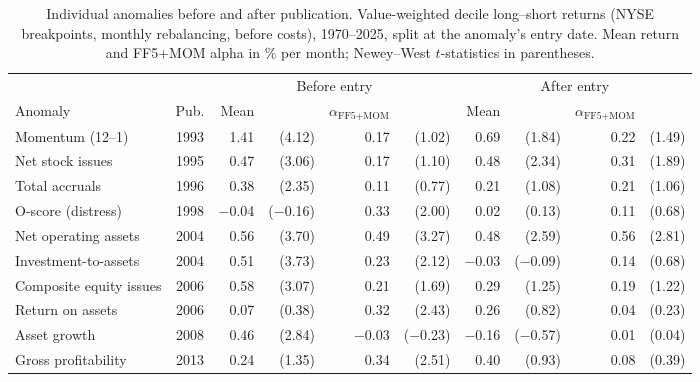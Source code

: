 \documentclass[12pt,a4paper]{article}
\begin{document}
\begin{singlespace}
\begin{table}[!htbp]\centering
\caption{Individual anomalies before and after publication. Value-weighted decile long--short returns (NYSE breakpoints, monthly rebalancing, before costs), 1970--2025, split at the anomaly's entry date. Mean return and FF5+MOM alpha in \% per month; Newey--West $t$-statistics in parentheses.}\label{tab:single}
\footnotesize
\setlength{\tabcolsep}{2.5pt}\begin{tabular}{lcrrrr|rrrr}\toprule
 & & \multicolumn{4}{c|}{Before entry} & \multicolumn{4}{c}{After entry}\\
Anomaly & Pub. & Mean & & $\alpha_{\text{FF5+MOM}}$ & & Mean & & $\alpha_{\text{FF5+MOM}}$ & \\\midrule
Momentum (12--1) & 1993 & 1.41 & (4.12) & 0.17 & (1.02) & 0.69 & (1.84) & 0.22 & (1.49)\\
Net stock issues & 1995 & 0.47 & (3.06) & 0.17 & (1.10) & 0.48 & (2.34) & 0.31 & (1.89)\\
Total accruals & 1996 & 0.38 & (2.35) & 0.11 & (0.77) & 0.21 & (1.08) & 0.21 & (1.06)\\
O-score (distress) & 1998 & \ensuremath{-}0.04 & (\ensuremath{-}0.16) & 0.33 & (2.00) & 0.02 & (0.13) & 0.11 & (0.68)\\
Net operating assets & 2004 & 0.56 & (3.70) & 0.49 & (3.27) & 0.48 & (2.59) & 0.56 & (2.81)\\
Investment-to-assets & 2004 & 0.51 & (3.73) & 0.23 & (2.12) & \ensuremath{-}0.03 & (\ensuremath{-}0.09) & 0.14 & (0.68)\\
Composite equity issues & 2006 & 0.58 & (3.07) & 0.21 & (1.69) & 0.29 & (1.25) & 0.19 & (1.22)\\
Return on assets & 2006 & 0.07 & (0.38) & 0.32 & (2.43) & 0.26 & (0.82) & 0.04 & (0.23)\\
Asset growth & 2008 & 0.46 & (2.84) & \ensuremath{-}0.03 & (\ensuremath{-}0.23) & \ensuremath{-}0.16 & (\ensuremath{-}0.57) & 0.01 & (0.04)\\
Gross profitability & 2013 & 0.24 & (1.35) & 0.34 & (2.51) & 0.40 & (0.93) & 0.08 & (0.39)\\
\bottomrule\end{tabular}
\end{table}


\end{singlespace}
\end{document}
